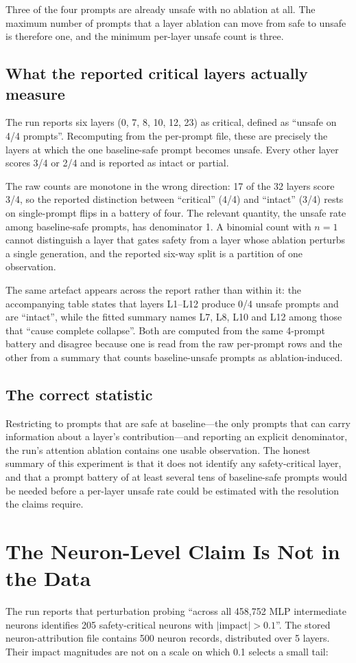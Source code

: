 \documentclass[11pt]{article}
\begin{document}
Three of the four prompts are already unsafe with no ablation at all. The maximum number of prompts that a layer ablation can move from safe to unsafe is therefore one, and the minimum per-layer unsafe count is three.

\subsection{What the reported critical layers actually measure}
The run reports six layers (0, 7, 8, 10, 12, 23) as critical, defined as ``unsafe on 4/4 prompts''. Recomputing from the per-prompt file, these are precisely the layers at which the one baseline-safe prompt becomes unsafe. Every other layer scores 3/4 or 2/4 and is reported as intact or partial.

The raw counts are monotone in the wrong direction: 17 of the 32 layers score 3/4, so the reported distinction between ``critical'' (4/4) and ``intact'' (3/4) rests on single-prompt flips in a battery of four. The relevant quantity, the unsafe rate among baseline-safe prompts, has denominator 1. A binomial count with $n=1$ cannot distinguish a layer that gates safety from a layer whose ablation perturbs a single generation, and the reported six-way split is a partition of one observation.

The same artefact appears across the report rather than within it: the accompanying table states that layers L1--L12 produce 0/4 unsafe prompts and are ``intact'', while the fitted summary names L7, L8, L10 and L12 among those that ``cause complete collapse''. Both are computed from the same 4-prompt battery and disagree because one is read from the raw per-prompt rows and the other from a summary that counts baseline-unsafe prompts as ablation-induced.

\subsection{The correct statistic}
Restricting to prompts that are safe at baseline---the only prompts that can carry information about a layer's contribution---and reporting an explicit denominator, the run's attention ablation contains one usable observation. The honest summary of this experiment is that it does not identify any safety-critical layer, and that a prompt battery of at least several tens of baseline-safe prompts would be needed before a per-layer unsafe rate could be estimated with the resolution the claims require.

\section{The Neuron-Level Claim Is Not in the Data}
The run reports that perturbation probing ``across all 458{,}752 MLP intermediate neurons identifies 205 safety-critical neurons with $|\text{impact}| > 0.1$''. The stored neuron-attribution file contains 500 neuron records, distributed over 5 layers. Their impact magnitudes are not on a scale on which 0.1 selects a small tail:
\end{document}
